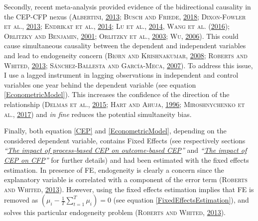 \documentclass[12pt,]{article}
\begin{document}
Secondly, recent meta-analysis provided evidence of the bidirectional
causality in the CEP-CFP nexus (\textsc{Albertini},
\protect\hyperlink{ref-Albertini2013}{2013}; \textsc{Busch and Friede},
\protect\hyperlink{ref-Busch2018}{2018}; \textsc{Dixon-Fowler et al.},
\protect\hyperlink{ref-Dixon-Fowler2013}{2013}; \textsc{Endrikat et
al.}, \protect\hyperlink{ref-EndrikatMakingsenseconflicting2014}{2014};
\textsc{Lu et al.},
\protect\hyperlink{ref-Ludecadedebatenexus2014}{2014}, \textsc{Wang et
al.}
(\protect\hyperlink{ref-WangMetaAnalyticReviewCorporate2016}{2016});
\textsc{Orlitzky and Benjamin},
\protect\hyperlink{ref-Orlitzky2001}{2001}; \textsc{Orlitzky et al.},
\protect\hyperlink{ref-Orlitzky2003}{2003}; \textsc{Wu},
\protect\hyperlink{ref-Wu2006}{2006}). This could cause simultaneous
causality between the dependent and independent variables and lead to
endogeneity concern (\textsc{Biørn and Krishnakumar},
\protect\hyperlink{ref-Biorn2008}{2008}; \textsc{Roberts and Whited},
\protect\hyperlink{ref-Roberts2013}{2013}; \textsc{Sánchez-Ballesta and
García-Meca}, \protect\hyperlink{ref-Sanchez-Ballesta2007}{2007}). To
address this issue, I use a lagged instrument in lagging observations in
independent and control variables one year behind the dependent variable
(see equation \ref{EconometricModel}). This increases the confidence of
the direction of the relationship (\textsc{Delmas et al.},
\protect\hyperlink{ref-Delmas2015}{2015}; \textsc{Hart and Ahuja},
\protect\hyperlink{ref-Hart1996}{1996}; \textsc{Miroshnychenko et al.},
\protect\hyperlink{ref-MiroshnychenkoGreenpracticesfinancial2017}{2017})
and \emph{in fine} reduces the potential simultaneity bias.

Finally, both equation \ref{CEP} and \ref{EconometricModel}, depending
on the considered dependent variable, contains Fixed Effects (see
respectively sections
\emph{``\protect\hyperlink{the-impact-of-process-based-cep-on-outcome-based-cep-1}{The
impact of process-based CEP on outcome-based CEP}''} and
\emph{``\protect\hyperlink{the-impact-of-cep-on-cfp-2}{The impact of CEP
on CFP}''} for further details) and had been estimated with the fixed
effects estimation. In presence of FE, endogeneity is clearly a concern
since the explanatory variable is correlated with a component of the
error term (\textsc{Roberts and Whited},
\protect\hyperlink{ref-Roberts2013}{2013}). However, using the fixed
effects estimation implies that FE is removed as
\(( \mu_{i} - \frac{1}{T} \displaystyle\sum_{t=1}^{T} \mu_{i} ) = 0\)
(see equation \ref{FixedEffectsEstimation}), and solves this particular
endogeneity problem (\textsc{Roberts and Whited},
\protect\hyperlink{ref-Roberts2013}{2013}).
\end{document}
